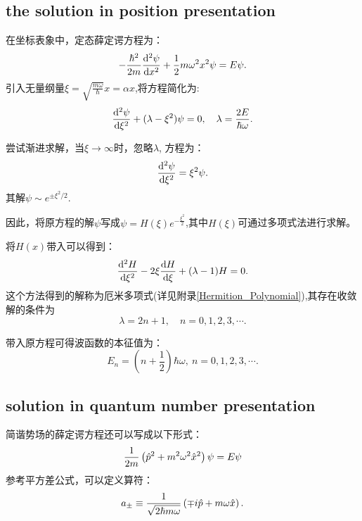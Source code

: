 \subsection{the solution in position presentation}
在坐标表象中，定态薛定谔方程为：
\begin{equation}
    -\frac{\hbar^2}{2m}\frac{\mathrm{d}^2 \psi}{\mathrm{d} x^2}+\frac{1}{2}m\omega^2x^2\psi=E\psi.
\end{equation}
引入无量纲量$\xi=\sqrt{\frac{m\omega}{\hbar}}x=\alpha x$,将方程简化为:
\begin{equation}
    \frac{\mathrm{d}^2 \psi}{\mathrm{d} \xi^2}+(\lambda-\xi^2)\psi=0, \quad \lambda=\frac{2E}{\hbar\omega}.
\end{equation}

尝试渐进求解，当$\xi\to\infty$时，忽略$\lambda$, 方程为：
\begin{equation}
    \frac{\mathrm{d}^2 \psi}{\mathrm{d} \xi^2}=\xi^2\psi.
\end{equation}
其解$\psi\sim e^{\pm\xi^2/2}$.

因此，将原方程的解$\psi$写成$\psi=H(\xi)e^{-\frac{\xi^2}{2}}$,其中$H(\xi)$可通过多项式法进行求解。

将$H(x)$带入可以得到：
\begin{equation}
    \frac{\mathrm{d}^2 H}{\mathrm{d} \xi^2}-2\xi\frac{\mathrm{d} H}{\mathrm{d} \xi}+(\lambda-1)H=0.
\end{equation}
这个方法得到的解称为厄米多项式(详见附录\ref{Hermition_Polynomial}),其存在收敛解的条件为
\begin{equation}
    \lambda=2n+1, \quad n=0,1,2,3,\cdots.
\end{equation}

带入原方程可得波函数的本征值为：
\begin{equation}
    E_n=\left(n+\frac{1}{2}\right)\hbar\omega,\ n=0,1,2,3,\cdots. 
\end{equation}

\subsection{solution in quantum number presentation}

简谐势场的薛定谔方程还可以写成以下形式：
\begin{equation}
    \frac{1}{2m}\left(\hat{p}^2+m^2\omega^2\hat{x}^2\right)\psi=E\psi
\end{equation}
参考平方差公式，可以定义算符：
\begin{equation}
    a_{\pm}\equiv \frac{1}{\sqrt{2\hbar m\omega}}\left(\mp i\hat{p}+m\omega \hat{x}\right).
\end{equation}

